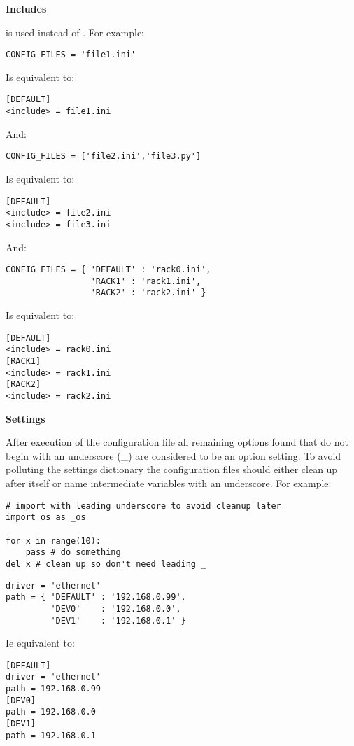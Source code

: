\documentclass{howto}
\begin{document}
\textbf{Includes}

 is used instead of .  For example:

\begin{verbatim}
CONFIG_FILES = 'file1.ini'
\end{verbatim}
Is equivalent to:
\begin{verbatim}
[DEFAULT]
<include> = file1.ini
\end{verbatim}

And:

\begin{verbatim}
CONFIG_FILES = ['file2.ini','file3.py']
\end{verbatim}
Is equivalent to:
\begin{verbatim}
[DEFAULT]
<include> = file2.ini
<include> = file3.ini
\end{verbatim}

And:

\begin{verbatim}
CONFIG_FILES = { 'DEFAULT' : 'rack0.ini',
                 'RACK1' : 'rack1.ini', 
                 'RACK2' : 'rack2.ini' }
\end{verbatim}
Is equivalent to:
\begin{verbatim}
[DEFAULT]
<include> = rack0.ini
[RACK1]
<include> = rack1.ini
[RACK2]
<include> = rack2.ini
\end{verbatim}

\textbf{Settings}

After execution of the configuration file all remaining options found that 
do not begin with an underscore (_) are considered to be an option setting.  
To avoid polluting the settings dictionary the configuration files should 
either clean up after itself or name intermediate variables with an underscore.  
For example:

\begin{verbatim}
# import with leading underscore to avoid cleanup later
import os as _os

for x in range(10):
    pass # do something
del x # clean up so don't need leading _
\end{verbatim}

\begin{verbatim}
driver = 'ethernet'
path = { 'DEFAULT' : '192.168.0.99',
         'DEV0'    : '192.168.0.0',
         'DEV1'    : '192.168.0.1' }
\end{verbatim}
Ie equivalent to:
\begin{verbatim}
[DEFAULT]
driver = 'ethernet'
path = 192.168.0.99
[DEV0]
path = 192.168.0.0
[DEV1]
path = 192.168.0.1
\end{verbatim}
\end{document}
